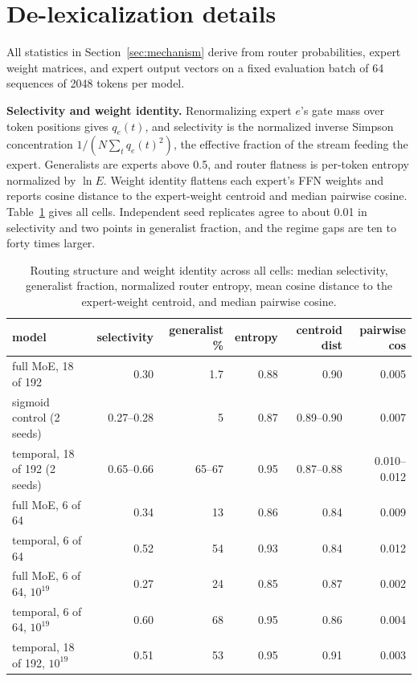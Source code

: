\documentclass{article}
\begin{document}



\appendix

\section{De-lexicalization details}\label{app:mechanism}

All statistics in Section~\ref{sec:mechanism} derive from router probabilities, expert weight
matrices, and expert output vectors on a fixed evaluation batch of 64 sequences of 2048 tokens
per model.

\textbf{Selectivity and weight identity.} Renormalizing expert $e$'s gate mass over token
positions gives $q_e(t)$, and selectivity is the normalized inverse Simpson concentration
$1/(N\sum_t q_e(t)^2)$, the effective fraction of the stream feeding the expert. Generalists are
experts above 0.5, and router flatness is per-token entropy normalized by $\ln E$. Weight
identity flattens each expert's FFN weights and reports cosine distance to the expert-weight
centroid and median pairwise cosine. Table~\ref{tab:structural} gives all cells. Independent
seed replicates agree to about 0.01 in selectivity and two points in generalist fraction, and
the regime gaps are ten to forty times larger.

\begin{table}[h]
  \centering\small
  \caption{Routing structure and weight identity across all cells: median selectivity,
  generalist fraction, normalized router entropy, mean cosine distance to the expert-weight
  centroid, and median pairwise cosine.}
  \label{tab:structural}
  \vspace{4pt}
  \begin{tabular}{@{}lrrrrr@{}}
    \toprule
    model & selectivity & generalist \% & entropy & centroid dist & pairwise cos \\
    \midrule
    full MoE, 18 of 192            & 0.30 & 1.7 & 0.88 & 0.90 & 0.005 \\
    sigmoid control (2 seeds)      & 0.27--0.28 & 5 & 0.87 & 0.89--0.90 & 0.007 \\
    temporal, 18 of 192 (2 seeds)  & 0.65--0.66 & 65--67 & 0.95 & 0.87--0.88 & 0.010--0.012 \\
    full MoE, 6 of 64              & 0.34 & 13 & 0.86 & 0.84 & 0.009 \\
    temporal, 6 of 64              & 0.52 & 54 & 0.93 & 0.84 & 0.012 \\
    full MoE, 6 of 64, $10^{19}$   & 0.27 & 24 & 0.85 & 0.87 & 0.002 \\
    temporal, 6 of 64, $10^{19}$   & 0.60 & 68 & 0.95 & 0.86 & 0.004 \\
    temporal, 18 of 192, $10^{19}$ & 0.51 & 53 & 0.95 & 0.91 & 0.003 \\
    \bottomrule
  \end{tabular}
\end{table}
\end{document}
